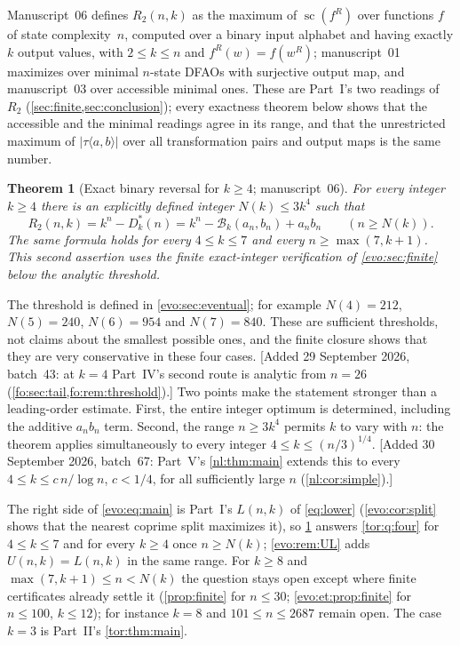 \documentclass[11pt,a4paper]{article}
\numberwithin{equation}{section}
\newtheorem{theorem}{Theorem}[section]
\theoremstyle{definition}
\theoremstyle{remark}
\newcommand{\statecomplex}{\operatorname{sc}}
\newcommand{\Bip}{\mathcal B}
\begin{document}
Manuscript~06 defines $R_2(n,k)$ as the maximum of $\statecomplex(f^R)$ over
functions $f$ of state complexity~$n$, computed over a binary input alphabet
and having exactly $k$ output values, with $2\le k\le n$ and $f^R(w)=f(w^R)$;
manuscript~01 maximizes over minimal $n$-state DFAOs with surjective output
map, and manuscript~03 over accessible minimal ones. These are Part~I's two
readings of $R_2$ (\cref{sec:finite,sec:conclusion}); every exactness theorem
below shows that the accessible and the minimal readings agree in its range,
and that the unrestricted maximum of $|\tau\langle a,b\rangle|$ over all
transformation pairs and output maps is the same number.

\begin{theorem}[Exact binary reversal for $k\ge4$; manuscript~06]\label{evo:thm:main}
For every integer $k\ge4$ there is an explicitly defined integer
$N(k)\le3k^4$ such that
\begin{equation}\label{evo:eq:main}
 \boxed{\quad R_2(n,k)=k^n-D^*_k(n)=k^n-\Bip_k(a_n,b_n)+a_nb_n
 \qquad(n\ge N(k)).\quad}
\end{equation}
The same formula holds for every $4\le k\le7$ and every $n\ge\max(7,k+1)$.
This second assertion uses the finite exact-integer verification of
\cref{evo:sec:finite} below the analytic threshold.
\end{theorem}

The threshold is defined in \cref{evo:sec:eventual}; for example $N(4)=212$,
$N(5)=240$, $N(6)=954$ and $N(7)=840$. These are sufficient thresholds, not
claims about the smallest possible ones, and the finite closure shows that
they are very conservative in these four cases. [Added 29 September 2026,
batch~43: at $k=4$ Part~IV's second route is analytic from $n=26$
(\cref{fo:sec:tail,fo:rem:threshold}).] Two points make the statement
stronger than a leading-order estimate. First, the entire integer optimum is
determined, including the additive $a_nb_n$ term. Second, the range
$n\ge3k^4$ permits $k$ to vary with $n$: the theorem applies simultaneously to
every integer $4\le k\le(n/3)^{1/4}$. [Added 30 September 2026, batch~67: Part~V's \cref{nl:thm:main} extends this to every
$4\le k\le c\,n/\log n$, $c<1/4$, for all sufficiently large $n$
(\cref{nl:cor:simple}).]

The right side of \eqref{evo:eq:main} is Part~I's $L(n,k)$ of \eqref{eq:lower}
(\cref{evo:cor:split} shows that the nearest coprime split maximizes it), so
\cref{evo:thm:main} answers \cref{tor:q:four} for $4\le k\le7$ and for every
$k\ge4$ once $n\ge N(k)$; \cref{evo:rem:UL} adds $U(n,k)=L(n,k)$ in the same
range. For $k\ge8$ and $\max(7,k+1)\le n<N(k)$ the question stays open except
where finite certificates already settle it (\cref{prop:finite} for
$n\le30$; \cref{evo:et:prop:finite} for $n\le100$, $k\le12$); for instance
$k=8$ and $101\le n\le2687$ remain open. The case $k=3$ is Part~II's
\cref{tor:thm:main}.
\end{document}
